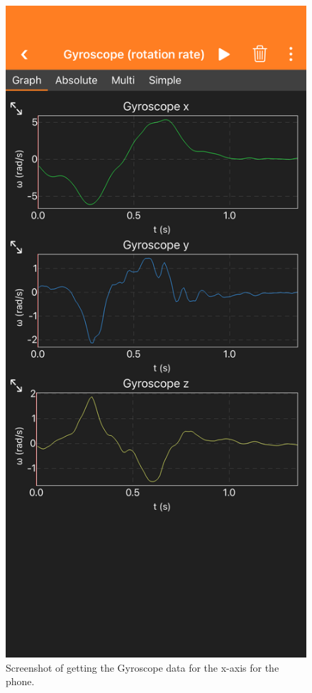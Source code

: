 \documentclass[idxtotoc,hyperref,openany]{labbook} %
\begin{document}
\begin{figure}[H] %
\begin{center}
\includegraphics[width=.7\linewidth]{images/Lab.02/GyyroscopeX.PNG}
\end{center}
\caption{Screenshot of getting the Gyroscope data for the x-axis for the phone.}
\label{fig:Lab02-GyroscopeX}
\end{figure}
\end{document}
